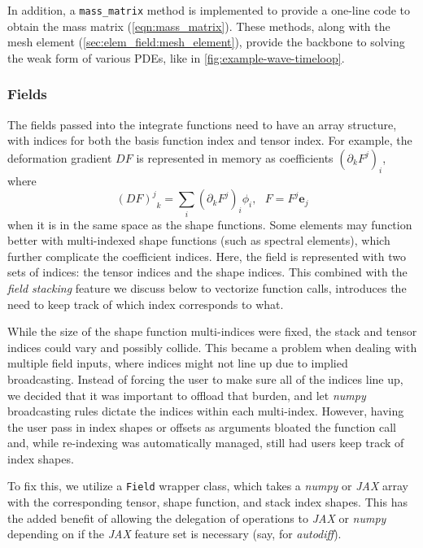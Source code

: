 In addition, a \verb+mass_matrix+ method is implemented to provide a one-line code to obtain the mass matrix (\ref{eqn:mass_matrix}). These methods, along with the mesh element (\ref{sec:elem_field:mesh_element}), provide the backbone to solving the weak form of various PDEs, like in \autoref{fig:example-wave-timeloop}.

\subsubsection{Fields} \label{sec:elem_field:fields}

The fields passed into the integrate functions need to have an array structure, with indices for both the basis function index and tensor index. For example, the deformation gradient $DF$ is represented in memory as coefficients $\left(\partial_k F^j\right)_i$, where
\begin{equation}
{(DF)^j}_{k} = \sum_i\left(\partial_k F^j\right)_i\phi_i,~~~F=F^j\mathbf{e}_j
\label{eqn:def_grad_discrete}
\end{equation}
when it is in the same space as the shape functions. Some elements may function better with multi-indexed shape functions (such as spectral elements), which further complicate the coefficient indices. Here, the field is represented with two sets of indices: the tensor indices and the shape indices. This combined with the \emph{field stacking} feature we discuss below to vectorize function calls, introduces the need to keep track of which index corresponds to what.

\bigskip

While the size of the shape function multi-indices were fixed, the stack and tensor indices could vary and possibly collide. This became a problem when dealing with multiple field inputs, where indices might not line up due to implied broadcasting. Instead of forcing the user to make sure all of the indices line up, we decided that it was important to offload that burden, and let \emph{numpy} broadcasting rules dictate the indices within each multi-index. However, having the user pass in index shapes or offsets as arguments bloated the function call and, while re-indexing was automatically managed, still had users keep track of index shapes.

\bigskip

To fix this, we utilize a \verb+Field+ wrapper class, which takes a \emph{numpy} or \emph{JAX} array with the corresponding tensor, shape function, and stack index shapes. This has the added benefit of allowing the delegation of operations to \emph{JAX} or \emph{numpy} depending on if the \emph{JAX} feature set is necessary (say, for \emph{autodiff}).

